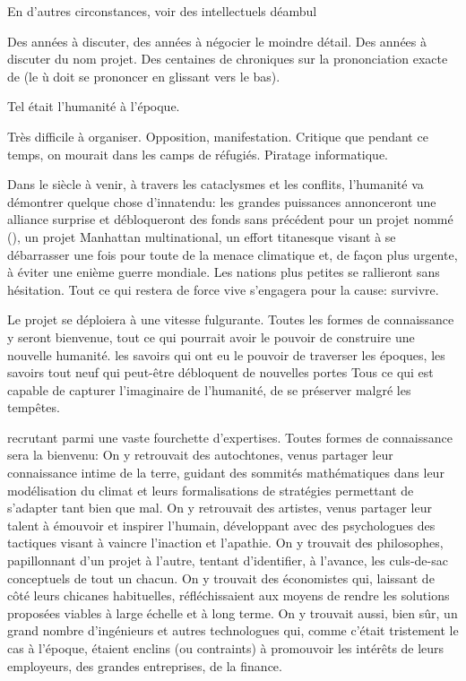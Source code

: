 En d'autres circonstances, 
voir des intellectuels déambul

Des années à discuter, des années à négocier le moindre détail. 
Des années à discuter du nom projet. Des centaines de chroniques
sur la prononciation exacte de \nomProjet{} (le \og ù \fg doit se prononcer en glissant vers le bas).

Tel était l'humanité à l'époque.

Très difficile à organiser.  Opposition, manifestation. Critique que pendant ce
temps, on mourait dans les camps de réfugiés.
Piratage informatique.


Dans le siècle à venir, à travers les cataclysmes et les conflits, l'humanité
va démontrer quelque chose d'innatendu: les grandes puissances annonceront une
alliance surprise et débloqueront des fonds sans précédent pour un projet nommé
\textit{\nomProjet{}} (\nomProjetEn{}), un projet Manhattan multinational, un
effort titanesque visant à se débarrasser une fois pour toute de la menace
climatique et, de façon plus urgente, à éviter une enième guerre mondiale.  Les
nations plus petites se rallieront sans hésitation.  Tout ce qui restera de
force vive s'engagera pour la cause: survivre.

Le projet \nomProjet{} se déploiera à une vitesse fulgurante.  Toutes les
formes de connaissance y seront bienvenue, tout ce qui pourrait avoir le
pouvoir de construire une nouvelle humanité.  les savoirs qui ont eu le pouvoir
de traverser les époques, les savoirs tout neuf qui peut-être débloquent de
nouvelles portes Tous ce qui est capable de capturer l'imaginaire de
l'humanité, de se préserver malgré les tempêtes.



recrutant parmi une vaste fourchette d'expertises.  
Toutes formes de connaissance sera la bienvenu:
On y
retrouvait des autochtones, venus partager leur connaissance intime de la
terre, guidant des sommités mathé\-matiques dans leur modélisation du climat et
leurs formalisations de stra\-tégies permettant de s'adapter tant
bien que mal.  On y retrouvait des artistes, venus partager leur talent à
émouvoir et inspirer l'humain, développant avec des psychologues des
tactiques visant à vaincre l'in\-act\-ion et l'apathie.  On y trouvait des
philosophes, papillonnant d'un projet à l'autre, tentant d'identifier, à
l'avance, les culs-de-sac con\-cept\-uels de tout un chacun.  On y trouvait
des économistes qui, laissant de côté leurs chicanes habituelles,
réfléchissaient aux moyens de rendre les solutions proposées viables à
large échelle et à long terme.  On y trouvait aussi, bien sûr, un grand
nombre d'ingénieurs et autres technologues qui, comme c'était trist\-ement
le cas à l'époque, étaient enclins (ou contraints) à promouvoir les
intérêts de leurs employeurs, des grandes entreprises, de la finance.


